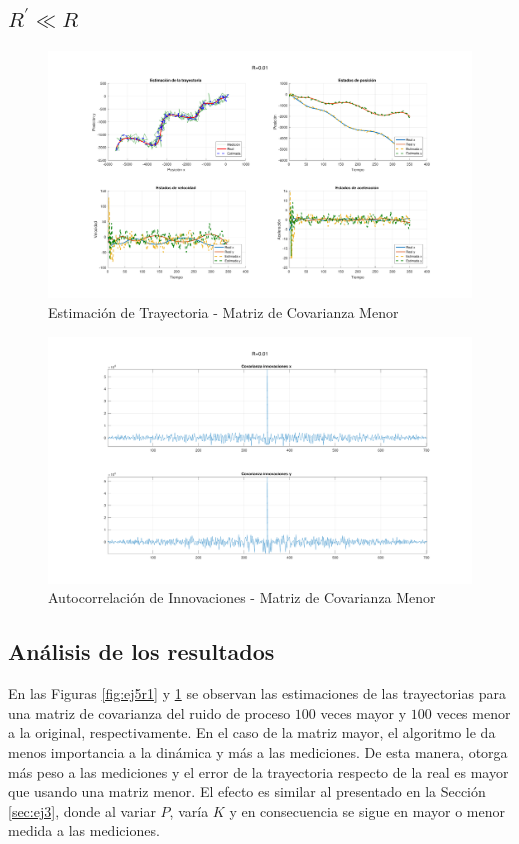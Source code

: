 	
	\subsection{$R^{'}\ll R$}
	
	\begin{figure}[H]
		\centering
		\includegraphics[scale=0.5,trim={6,5cm 0 0 0}]{Figuras/graf_ej6_R2.pdf}
		\caption{Estimación de Trayectoria - Matriz de Covarianza Menor}
		\label{fig:ej5r2}
	\end{figure}
	
	\begin{figure}[H]
		\centering
		\includegraphics[width=1.0\textwidth,keepaspectratio]{Figuras/covinn_ej6_R2.pdf}
		\caption{Autocorrelación de Innovaciones - Matriz de Covarianza Menor}
		\label{fig:ej5r2_innov}
	\end{figure}
	
	\subsection{Análisis de los resultados}
	En las Figuras \ref{fig:ej5r1} y \ref{fig:ej5r2} se observan las estimaciones de las trayectorias para una matriz de covarianza del ruido de proceso $100$ veces mayor y $100$ veces menor a la original, respectivamente. En el caso de la matriz mayor, el algoritmo le da menos importancia a la dinámica y más a las mediciones. De esta manera, otorga más peso a las mediciones y el error de la trayectoria respecto de la real es mayor que usando una matriz menor. El efecto es similar al presentado en la Sección \ref{sec:ej3}, donde al variar $P$, varía $K$ y en consecuencia se sigue en mayor o menor medida a las mediciones.\\


